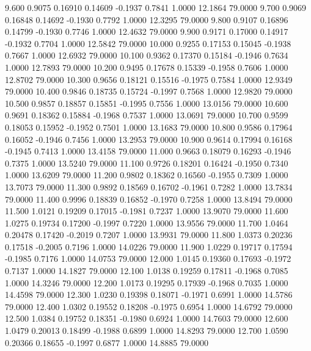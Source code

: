    9.600   0.9075   0.16910   0.14609  -0.1937   0.7841   1.0000  12.1864  79.0000
   9.700   0.9069   0.16848   0.14692  -0.1930   0.7792   1.0000  12.3295  79.0000
   9.800   0.9107   0.16896   0.14799  -0.1930   0.7746   1.0000  12.4632  79.0000
   9.900   0.9171   0.17000   0.14917  -0.1932   0.7704   1.0000  12.5842  79.0000
  10.000   0.9255   0.17153   0.15045  -0.1938   0.7667   1.0000  12.6932  79.0000
  10.100   0.9362   0.17370   0.15184  -0.1946   0.7634   1.0000  12.7893  79.0000
  10.200   0.9495   0.17678   0.15339  -0.1958   0.7606   1.0000  12.8702  79.0000
  10.300   0.9656   0.18121   0.15516  -0.1975   0.7584   1.0000  12.9349  79.0000
  10.400   0.9846   0.18735   0.15724  -0.1997   0.7568   1.0000  12.9820  79.0000
  10.500   0.9857   0.18857   0.15851  -0.1995   0.7556   1.0000  13.0156  79.0000
  10.600   0.9691   0.18362   0.15884  -0.1968   0.7537   1.0000  13.0691  79.0000
  10.700   0.9599   0.18053   0.15952  -0.1952   0.7501   1.0000  13.1683  79.0000
  10.800   0.9586   0.17964   0.16052  -0.1946   0.7456   1.0000  13.2953  79.0000
  10.900   0.9614   0.17994   0.16168  -0.1945   0.7413   1.0000  13.4158  79.0000
  11.000   0.9663   0.18079   0.16293  -0.1946   0.7375   1.0000  13.5240  79.0000
  11.100   0.9726   0.18201   0.16424  -0.1950   0.7340   1.0000  13.6209  79.0000
  11.200   0.9802   0.18362   0.16560  -0.1955   0.7309   1.0000  13.7073  79.0000
  11.300   0.9892   0.18569   0.16702  -0.1961   0.7282   1.0000  13.7834  79.0000
  11.400   0.9996   0.18839   0.16852  -0.1970   0.7258   1.0000  13.8494  79.0000
  11.500   1.0121   0.19209   0.17015  -0.1981   0.7237   1.0000  13.9070  79.0000
  11.600   1.0275   0.19734   0.17200  -0.1997   0.7220   1.0000  13.9556  79.0000
  11.700   1.0464   0.20478   0.17420  -0.2019   0.7207   1.0000  13.9931  79.0000
  11.800   1.0373   0.20236   0.17518  -0.2005   0.7196   1.0000  14.0226  79.0000
  11.900   1.0229   0.19717   0.17594  -0.1985   0.7176   1.0000  14.0753  79.0000
  12.000   1.0145   0.19360   0.17693  -0.1972   0.7137   1.0000  14.1827  79.0000
  12.100   1.0138   0.19259   0.17811  -0.1968   0.7085   1.0000  14.3246  79.0000
  12.200   1.0173   0.19295   0.17939  -0.1968   0.7035   1.0000  14.4598  79.0000
  12.300   1.0230   0.19398   0.18071  -0.1971   0.6991   1.0000  14.5786  79.0000
  12.400   1.0302   0.19552   0.18208  -0.1975   0.6954   1.0000  14.6792  79.0000
  12.500   1.0384   0.19752   0.18351  -0.1980   0.6924   1.0000  14.7603  79.0000
  12.600   1.0479   0.20013   0.18499  -0.1988   0.6899   1.0000  14.8293  79.0000
  12.700   1.0590   0.20366   0.18655  -0.1997   0.6877   1.0000  14.8885  79.0000
